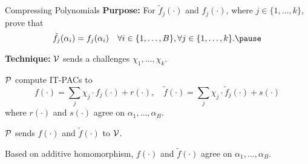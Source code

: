 \begin{frame}{Compressing Polynomials}
	\textbf{Purpose:} For $\tilde{f}_j(\cdot)$ and $f_j(\cdot)$, where $j \in \{1, \dots, k\}$, prove that \pause
	\begin{equation*}
		\tilde{f}_j(\alpha_i) = f_j(\alpha_i) \quad \forall i \in \{1, \dots, B\}, \forall j \in \{1,\dots, k\}. \pause
	\end{equation*}

	\textbf{Technique:} $\mathcal{V}$ sends a challenges $\chi_1, \dots, \chi_k$.\pause
	
	$\mathcal{P}$ compute IT-PACs to $$f(\cdot) = \sum_j \chi_j \cdot f_j(\cdot) + r(\cdot), \quad\tilde{f}(\cdot) = \sum_j \chi_j \cdot \tilde{f}_j(\cdot) + s(\cdot)$$\pause
	where $r(\cdot)$ and $s(\cdot)$ agree on $\alpha_1, \dots, \alpha_B$.\pause
	
	$\mathcal{P}$ sends $f(\cdot)$ and $\tilde{f}(\cdot)$ to $\mathcal{V}$.\pause
	
	Based on additive homomorphism, $f(\cdot)$ and $\tilde{f}(\cdot)$ agree on $\alpha_1, \dots, \alpha_B$.
\end{frame}